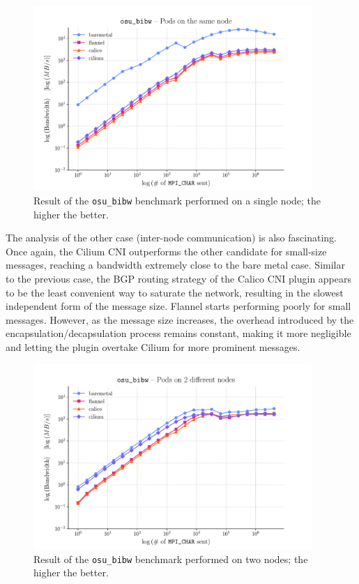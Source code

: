 \begin{figure}
  \centering
  \includegraphics[width=0.94\textwidth]{img/chpt3/bibw-1-node}
  \caption{Result of the \texttt{osu\_bibw} benchmark performed on a single
    node; the higher the better.}
  \label{fig:bibw-1-node}
\end{figure}

The analysis of the other case (inter-node communication) is also fascinating.
Once again, the Cilium CNI outperforms the other candidate for small-size
messages, reaching a bandwidth extremely close to the bare metal case.
Similar to the previous case, the BGP routing strategy of the Calico CNI plugin
appears to be the least convenient way to saturate the network, resulting in the
slowest independent form of the message size.
Flannel starts performing poorly for small messages. However, as the message
size increases, the overhead introduced by the encapsulation/decapsulation
process remains constant, making it more negligible and letting the plugin
overtake Cilium for more prominent messages.

\begin{figure}[H]
  \centering
  \includegraphics[width=0.94\textwidth]{img/chpt3/bibw-2-nodes}
  \caption{Result of the \texttt{osu\_bibw} benchmark performed on two nodes; the
    higher the better.}
  \label{fig:bibw-2-nodes}
\end{figure}

